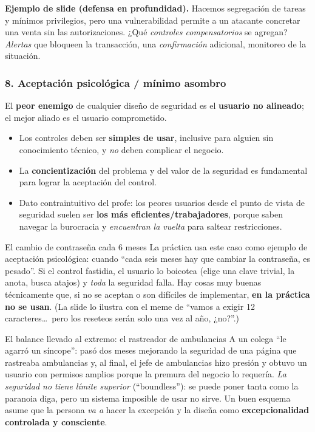 \documentclass[11pt,a4paper]{article}
\begin{document}
\begin{slidebox}
\textbf{Ejemplo de slide (defensa en profundidad).} Hacemos segregación de tareas y mínimos
privilegios, pero una vulnerabilidad permite a un atacante concretar una venta sin las
autorizaciones. ¿Qué \emph{controles compensatorios} se agregan? \emph{Alertas} que bloqueen la
transacción, una \emph{confirmación} adicional, monitoreo de la situación.
\end{slidebox}

\subsubsection{8. Aceptación psicológica / mínimo asombro}
El \textbf{peor enemigo} de cualquier diseño de seguridad es el \textbf{usuario no alineado};
el mejor aliado es el usuario comprometido.
\begin{itemize}[leftmargin=1.4em,itemsep=1pt]
  \item Los controles deben ser \textbf{simples de usar}, inclusive para alguien sin
        conocimiento técnico, y \emph{no} deben complicar el negocio.
  \item La \textbf{concientización} del problema y del valor de la seguridad es fundamental
        para lograr la aceptación del control.
  \item Dato contraintuitivo del profe: los peores usuarios desde el punto de vista de
        seguridad suelen ser \textbf{los más eficientes/trabajadores}, porque saben navegar la
        burocracia y \emph{encuentran la vuelta} para saltear restricciones.
\end{itemize}

\begin{practbox}{El cambio de contraseña cada 6 meses}
La práctica usa este caso como ejemplo de aceptación psicológica: cuando ``cada seis meses hay
que cambiar la contraseña, es pesado''. Si el control fastidia, el usuario lo boicotea (elige
una clave trivial, la anota, busca atajos) y \emph{toda} la seguridad falla. Hay cosas muy
buenas técnicamente que, si no se aceptan o son difíciles de implementar, \textbf{en la práctica
no se usan}. (La slide lo ilustra con el meme de ``vamos a exigir 12 caracteres\dots\ pero los
reseteos serán solo una vez al año, ¿no?''.)
\end{practbox}

\begin{warnbox}{El balance llevado al extremo: el rastreador de ambulancias}
A un colega ``le agarró un síncope'': pasó dos meses mejorando la seguridad de una página que
rastreaba ambulancias y, al final, el jefe de ambulancias hizo presión y obtuvo un usuario con
permisos amplios porque la premura del negocio lo requería. \emph{La seguridad no tiene límite
superior} (``boundless''): se puede poner tanta como la paranoia diga, pero un sistema
imposible de usar no sirve. Un buen esquema asume que la persona \emph{va a} hacer la excepción
y la diseña como \textbf{excepcionalidad controlada y consciente}.
\end{warnbox}
\end{document}
